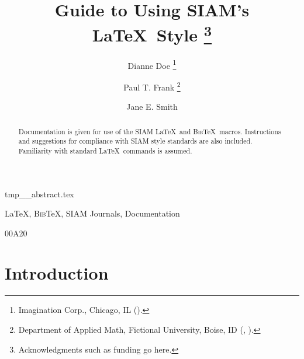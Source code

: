 \documentclass[]{siamart}
\title{Guide to Using SIAM's \LaTeX\ Style%
  \thanks{Acknowledgments such as funding go here.}}
\author{Dianne Doe%
  \thanks{Imagination Corp., Chicago, IL (\email{ddoe@imag.com}).}%
  \and
  Paul T. Frank%
  \thanks{Department of Applied Math, Fictional University, Boise, ID
    (\email{ptfrank@fictional.edu}, \email{jesmith@fictional.edu}).}
  \and
  Jane E. Smith%
  \footnotemark[3]
}
\newcommand{\BibTeX}{{\scshape Bib}\TeX\xspace}
\begin{document}
\maketitle


\begin{tcbverbatimwrite}{tmp_\jobname_abstract.tex}
\begin{abstract}
  Documentation is given for use of the SIAM \LaTeX\ and \BibTeX\ macros.
  Instructions and suggestions for compliance with SIAM style
  standards are also included. Familiarity with standard \LaTeX\
  commands is assumed.
\end{abstract}

\begin{keywords}
  \LaTeX, \BibTeX, SIAM Journals, Documentation 
\end{keywords}

\begin{AMS}
  00A20 
\end{AMS}
\end{tcbverbatimwrite}


\section{Introduction}
\label{sec:intro}
\end{document}
